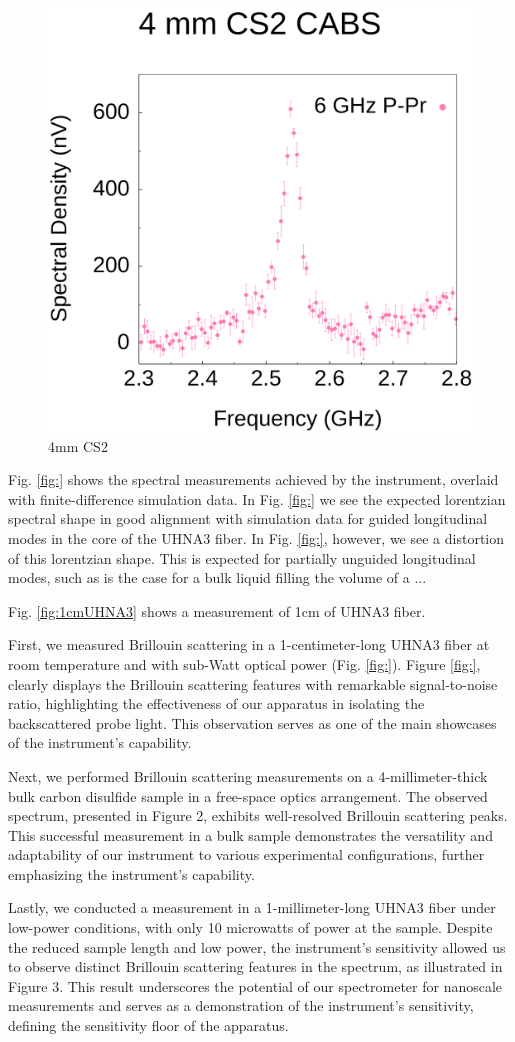 \documentclass[sn-nature]{sn-jnl}%
\begin{document}
\begin{figure}[t]
  \centering
  \includegraphics[width=.45\textwidth]{4mmCS2.pdf}
  \caption{4mm CS2}\label{fig:4mmCS2}
\end{figure}

Fig. \ref{fig:} shows the spectral measurements achieved by the instrument, overlaid with finite-difference simulation data. In Fig. \ref{fig:} we see the expected lorentzian spectral shape in good alignment with simulation data for guided longitudinal modes in the core of the UHNA3 fiber. In Fig. \ref{fig:}, however, we see a distortion of this lorentzian shape. This is expected for partially unguided longitudinal modes, such as is the case for a bulk liquid filling the volume of a ...

Fig. \ref{fig:1cmUHNA3} shows a measurement of 1cm of UHNA3 fiber.

First, we measured Brillouin scattering in a 1-centimeter-long UHNA3 fiber at room temperature and with sub-Watt optical power (Fig. \ref{fig:}). Figure \ref{fig:}, clearly displays the Brillouin scattering features with remarkable signal-to-noise ratio, highlighting the effectiveness of our apparatus in isolating the backscattered probe light. This observation serves as one of the main showcases of the instrument's capability.

Next, we performed Brillouin scattering measurements on a 4-millimeter-thick bulk carbon disulfide sample in a free-space optics arrangement. The observed spectrum, presented in Figure 2, exhibits well-resolved Brillouin scattering peaks. This successful measurement in a bulk sample demonstrates the versatility and adaptability of our instrument to various experimental configurations, further emphasizing the instrument's capability.

Lastly, we conducted a measurement in a 1-millimeter-long UHNA3 fiber under low-power conditions, with only 10 microwatts of power at the sample. Despite the reduced sample length and low power, the instrument's sensitivity allowed us to observe distinct Brillouin scattering features in the spectrum, as illustrated in Figure 3. This result underscores the potential of our spectrometer for nanoscale measurements and serves as a demonstration of the instrument's sensitivity, defining the sensitivity floor of the apparatus.
\end{document}
